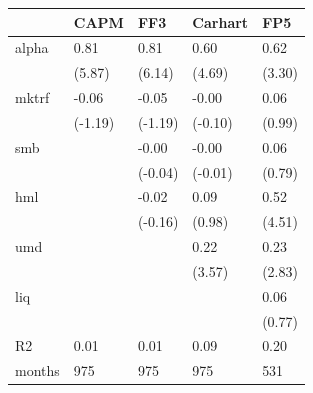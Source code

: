 \begin{tabular}{lllll}
\toprule
 & CAPM & FF3 & Carhart & FP5 \\
\midrule
alpha & 0.81 & 0.81 & 0.60 & 0.62 \\
 & (5.87) & (6.14) & (4.69) & (3.30) \\
mktrf & -0.06 & -0.05 & -0.00 & 0.06 \\
 & (-1.19) & (-1.19) & (-0.10) & (0.99) \\
smb &  & -0.00 & -0.00 & 0.06 \\
 &  & (-0.04) & (-0.01) & (0.79) \\
hml &  & -0.02 & 0.09 & 0.52 \\
 &  & (-0.16) & (0.98) & (4.51) \\
umd &  &  & 0.22 & 0.23 \\
 &  &  & (3.57) & (2.83) \\
liq &  &  &  & 0.06 \\
 &  &  &  & (0.77) \\
R2 & 0.01 & 0.01 & 0.09 & 0.20 \\
months & 975 & 975 & 975 & 531 \\
\bottomrule
\end{tabular}
